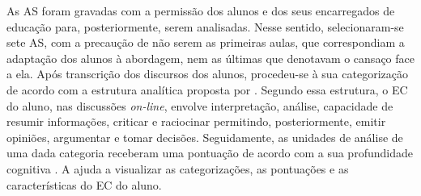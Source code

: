 \documentclass[portuguese]{textolivre}
\begin{document}
As AS foram gravadas com a permissão dos alunos e dos seus encarregados de educação para, posteriormente, serem analisadas. Nesse sentido, selecionaram-se sete AS, com a precaução de não serem as primeiras aulas, que correspondiam a adaptação dos alunos à abordagem, nem as últimas que denotavam o cansaço face a ela. Após transcrição dos discursos dos alunos, procedeu-se à sua categorização de acordo com a estrutura analítica proposta por \textcite{zhu_interaction_2006}. Segundo essa estrutura, o EC do aluno, nas discussões \textit{on-line}, envolve interpretação, análise, capacidade de resumir informações, criticar e raciocinar permitindo, posteriormente, emitir opiniões, argumentar e tomar decisões. Seguidamente, as unidades de análise de uma dada categoria receberam uma pontuação de acordo com a sua profundidade cognitiva \cite{xu_effects_2020}. A  ajuda a visualizar as categorizações, as pontuações e as características do EC do aluno.
\end{document}
